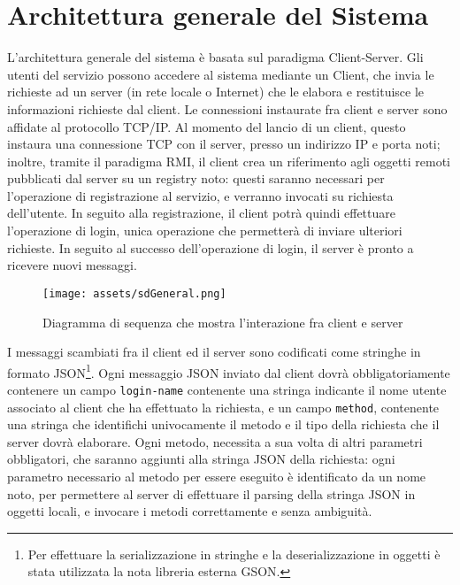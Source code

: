\documentclass{article}
\begin{document}
\section{Architettura generale del Sistema}
L'architettura generale del sistema è basata sul paradigma Client-Server. Gli utenti del servizio possono accedere al sistema mediante un Client, che invia le richieste ad un server (in rete locale o Internet) che le elabora e restituisce le informazioni richieste dal client. Le connessioni instaurate fra client e server sono affidate al protocollo TCP/IP. Al momento del lancio di un client, questo instaura una connessione TCP con il server, presso un indirizzo IP e porta noti; inoltre, tramite il paradigma RMI, il client crea un riferimento agli oggetti remoti pubblicati dal server su un registry noto: questi saranno necessari per l'operazione di registrazione al servizio, e verranno invocati su richiesta dell'utente. In seguito alla registrazione, il client potrà quindi effettuare l'operazione di login, unica operazione che permetterà di inviare ulteriori richieste. In seguito al successo dell'operazione di login, il server è pronto a ricevere nuovi messaggi.
\begin{figure}[htbp]
    \texttt{[image: assets/sdGeneral.png]}
    \centering
    \caption{\label{fig:sdGeneral}Diagramma di sequenza che mostra l'interazione fra client e server}
\end{figure}
\newpage
I messaggi scambiati fra il client ed il server sono codificati come stringhe in formato JSON\footnote{Per effettuare la serializzazione in stringhe e la deserializzazione in oggetti è stata utilizzata la nota libreria esterna GSON.}.   Ogni messaggio JSON inviato dal client dovrà obbligatoriamente contenere un campo \texttt{login-name} contenente una stringa indicante il nome utente associato al client che ha effettuato la richiesta, e un campo \texttt{method}, contenente una stringa che identifichi univocamente il metodo e il tipo della richiesta che il server dovrà elaborare. Ogni metodo, necessita a sua volta di altri parametri obbligatori, che saranno aggiunti alla stringa JSON della richiesta: ogni parametro necessario al metodo per essere eseguito è identificato da un nome noto, per permettere al server di effettuare il parsing della stringa JSON in oggetti locali, e invocare i metodi correttamente e senza ambiguità. 
\end{document}
